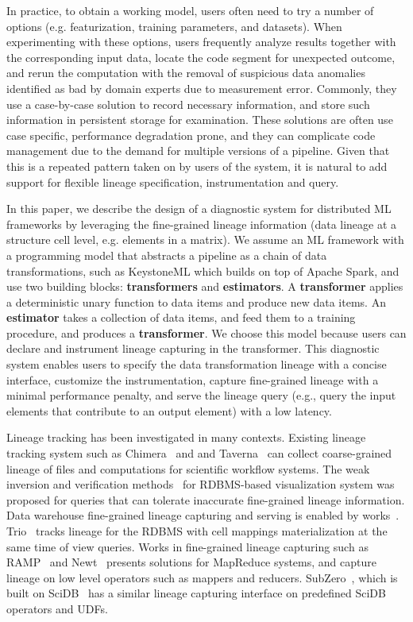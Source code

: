 \documentclass{sig-alternate}
\begin{document}
In practice, to obtain a working model, users often need to try a number of options (e.g. featurization, training parameters, and datasets). 
When experimenting with these options, users frequently analyze results together with the corresponding input data,  
locate the code segment for unexpected outcome, and rerun the computation with the removal of suspicious data anomalies
identified as bad by domain experts due to measurement error.
Commonly, they use a case-by-case solution to record necessary information, and store such information in persistent storage for examination.
These solutions are often use case specific, performance degradation prone, and they can complicate code
management due to the demand for multiple versions of a pipeline.
Given that this is a repeated pattern taken on by users of the system, it is natural to add support 
for flexible lineage specification, instrumentation and query.

In this paper, we describe the design of a diagnostic system for distributed ML frameworks by leveraging the fine-grained lineage information
(data lineage at a structure cell level, e.g. elements in a matrix). 
We assume an ML framework with a programming model that abstracts a pipeline as a chain of data transformations, such as KeystoneML
which builds on top of Apache Spark, and use two building blocks: {\bf transformers} and {\bf estimators}.
A {\bf transformer} applies a deterministic unary function to data items and produce new data items.
An {\bf estimator} takes a collection of data items, and feed them to a training procedure,  and produces a {\bf transformer}.
We choose this model because users can declare and instrument lineage capturing in the transformer.
This diagnostic system enables users to specify the data transformation lineage with a concise interface, customize the instrumentation, 
capture fine-grained lineage with a minimal performance penalty, and serve the lineage query 
(e.g., query the input elements that contribute to an output element) with a low latency. 

Lineage tracking has been investigated in many contexts.
Existing lineage tracking system such as Chimera~\cite{foster02} and and Taverna~\cite{oinn02} can collect coarse-grained lineage 
of files and computations for scientific workflow systems.
The weak inversion and verification methods~\cite{woodruff97} for RDBMS-based visualization system 
was proposed for queries that can tolerate inaccurate fine-grained lineage information.
Data warehouse fine-grained lineage capturing and serving is enabled by works~\cite{cui00, cui03}.
Trio~\cite{widom04} tracks lineage for the RDBMS with cell mappings materialization at the same time of view queries.
Works in fine-grained lineage capturing such as RAMP~\cite{ikeda11, park11} and Newt~\cite{logothetis13} presents
solutions for MapReduce systems, and capture lineage on low level operators such as mappers and reducers.
SubZero~\cite{wu13}, which is built on SciDB~\cite{brown10} has a similar lineage capturing interface on predefined SciDB operators and UDFs.
\end{document}
